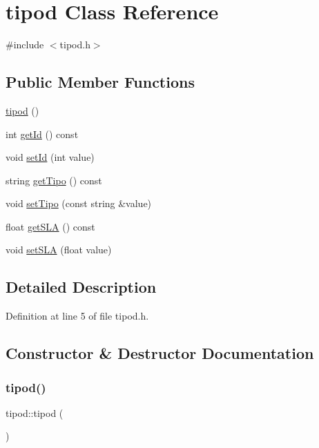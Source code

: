 \hypertarget{classtipod}{}\section{tipod Class Reference}
\label{classtipod}


{\ttfamily \#include $<$tipod.\+h$>$}

\subsection*{Public Member Functions}
\begin{DoxyCompactItemize}
\item 
\hyperlink{classtipod_aea0583170290bcfd453f00cd7e916b26}{tipod} ()
\item 
int \hyperlink{classtipod_a8f9426cbcef23976293ae0961b382907}{get\+Id} () const
\item 
void \hyperlink{classtipod_ae3f6b8df170353ef58a862b746d3d288}{set\+Id} (int value)
\item 
string \hyperlink{classtipod_a2cefc9bc0bfe44e8adfba1e839b2de2e}{get\+Tipo} () const
\item 
void \hyperlink{classtipod_ac1d39aaaa40c9c88611ed6274667dadb}{set\+Tipo} (const string \&value)
\item 
float \hyperlink{classtipod_a19cb0132a802684607abe02c0c2b63f2}{get\+S\+LA} () const
\item 
void \hyperlink{classtipod_ad0da4edb16cb79061875519e94b768d7}{set\+S\+LA} (float value)
\end{DoxyCompactItemize}


\subsection{Detailed Description}


Definition at line 5 of file tipod.\+h.



\subsection{Constructor \& Destructor Documentation}
\hypertarget{classtipod_aea0583170290bcfd453f00cd7e916b26}{}\label{classtipod_aea0583170290bcfd453f00cd7e916b26} 
\subsubsection{\texorpdfstring{tipod()}{tipod()}}
{\footnotesize\ttfamily tipod\+::tipod (\begin{DoxyParamCaption}{ }\end{DoxyParamCaption})}



